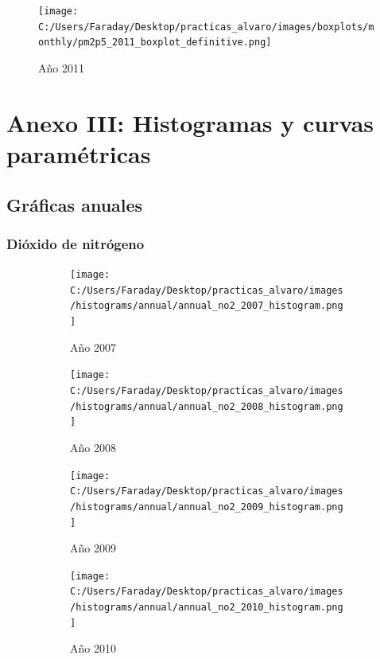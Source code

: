 \documentclass[12pt]{article}
\begin{document}
\newpage

\begin{figure}[H]
\texttt{[image: C:/Users/Faraday/Desktop/practicas\_alvaro/images/boxplots/monthly/pm2p5\_2011\_boxplot\_definitive.png]}
\caption{Año 2011}
\label{fig:box-ann-4-2011}
\end{figure}

\newpage

\section*{Anexo III: Histogramas y curvas paramétricas}
%

\subsection*{Gráficas anuales}
%

\subsubsection*{Dióxido de nitrógeno}
%

\begin{figure}[H]
\centering
\begin{subfigure}[h]{0.45\textwidth}
\texttt{[image: C:/Users/Faraday/Desktop/practicas\_alvaro/images/histograms/annual/annual\_no2\_2007\_histogram.png]}
\caption{Año 2007}
\label{fig:hist-ann-1-1}
\end{subfigure}
%
\begin{subfigure}[H]{0.45\textwidth}
\texttt{[image: C:/Users/Faraday/Desktop/practicas\_alvaro/images/histograms/annual/annual\_no2\_2008\_histogram.png]}
\caption{Año 2008}
\label{fig:hist-ann-1-2}
\end{subfigure}
\caption{}
\end{figure}

\begin{figure}[H]
\centering
\begin{subfigure}[h]{0.45\textwidth}
\texttt{[image: C:/Users/Faraday/Desktop/practicas\_alvaro/images/histograms/annual/annual\_no2\_2009\_histogram.png]}
\caption{Año 2009}
\label{fig:hist-ann-1-3}
\end{subfigure}
%
\begin{subfigure}[H]{0.45\textwidth}
\texttt{[image: C:/Users/Faraday/Desktop/practicas\_alvaro/images/histograms/annual/annual\_no2\_2010\_histogram.png]}
\caption{Año 2010}
\label{fig:hist-ann-1-4}
\end{subfigure}
\caption{}
\end{figure}
\end{document}
